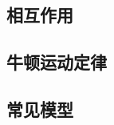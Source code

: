 
\begin{issues}
\issueDraft
\issueTODO
\end{issues}

\subsection{相互作用}

\subsection{牛顿运动定律}

\subsection{常见模型}
